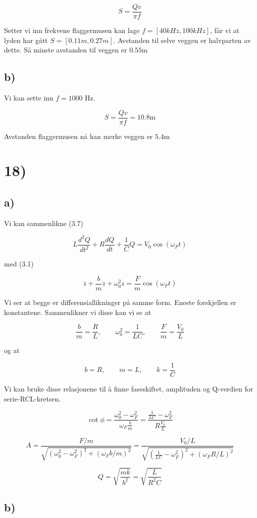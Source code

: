 \documentclass[a4paper,norsk, 10pt]{article}
\begin{document}
$$
S = \frac{Qv}{\pi f}
$$

Setter vi inn frekvene flaggermusen kan lage $f = [40 kHz,100 kHz]$, får vi at lyden har gått $S = [0.11m,0.27m]$. Avstanden til selve veggen er halvparten av dette. Så minste avstanden til veggen er $0.55$m

\subsection*{b)}

Vi kan sette inn $f = 1000$ Hz.

$$
S = \frac{Qv}{\pi  f} = 10.8 \mathrm{m}
$$

Avstanden flaggermusen nå kan merke veggen er $5.4$m


\section*{18)}
\subsection*{a)}

Vi kan sammenlikne (3.7)

$$
L\frac{d^2Q}{dt^2} + R\frac{dQ}{dt} + \frac{1}{C}Q = V_0 \cos(\omega_F t)
$$

med (3.1)

$$
\ddot{z} + \frac{b}{m}\dot{z} + \omega_0^2 z = \frac{F}{m}\cos(\omega_F t)
$$

Vi ser at begge er differensiallikninger på samme form. Eneste forskjellen er konstantene. Sammenlikner vi disse kan vi se at

$$
\frac{b}{m} = \frac{R}{L}, \qquad \omega_0^2 = \frac{1}{LC},\qquad \frac{F}{m} = \frac{V_0}{L}
$$

og at 

$$
b = R, \qquad m = L, \qquad k = \frac{1}{C}
$$

Vi kan bruke disse relasjonene til å finne faseskiftet, amplituden og Q-verdien for serie-RCL-kretsen.

$$
\cot \phi = \frac{\omega_0^2 - \omega_F^2}{\omega_F \frac{b}{m}} = \frac{\frac{1}{LC} - \omega_F^2}{R \frac{V_0}{L}}
$$

$$
A = \frac{F/m}{\sqrt{(\omega_0^2 - \omega_F^2)^2 + (\omega_Fb/m)^2}} = \frac{V_0/L}{\sqrt{(\frac{1}{LC} - \omega_F^2)^2 + (\omega_FR/L)^2}}
$$

$$
Q = \sqrt{\frac{mk}{b^2}} = \sqrt{\frac{L}{R^2C}}
$$

\subsection*{b)}
\end{document}
